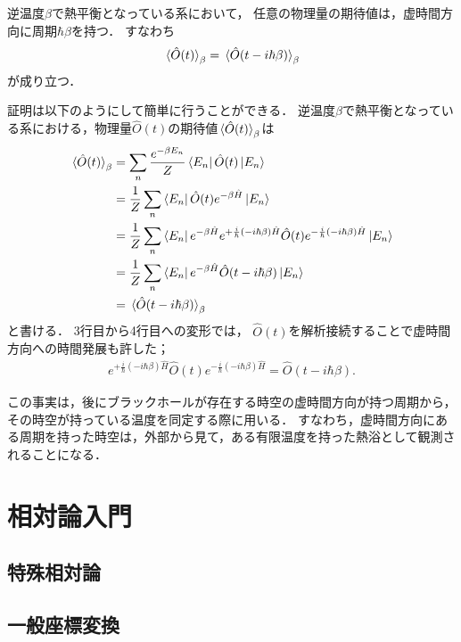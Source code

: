 \documentclass[uplatex,dvipdfmx]{vkaishi}
\begin{document}
逆温度$\beta$で熱平衡となっている系において，
任意の物理量の期待値は，虚時間方向に周期$\hbar\beta$を持つ．
すなわち
\begin{align}
  \expval*{\hat O(t)}_\beta
  = \expval*{\hat O(t - i\hbar\beta)}_\beta
  \label{eq:O-period}
\end{align}
が成り立つ．

証明は以下のようにして簡単に行うことができる．
逆温度$\beta$で熱平衡となっている系における，物理量$\hat O(t)$の期待値$\expval*{\hat O(t)}_\beta$は
\begin{align*}
  \expval*{\hat O(t)}_\beta
  &= \sum_n \frac{e^{-\beta E_n}}{Z} \bra{E_n} \hat O(t) \ket{E_n} \\
  &= \frac1Z \sum_n \bra{E_n} \hat O(t) e^{-\beta \hat H} \ket{E_n} \\
  &= \frac1Z \sum_n \bra{E_n} e^{-\beta \hat H} e^{+\frac{i}{\hbar}(-i\hbar\beta) \hat H} \hat O(t) e^{-\frac{i}{\hbar}(-i\hbar\beta) \hat H} \ket{E_n} \\
  &= \frac1Z \sum_n \bra{E_n} e^{-\beta \hat H} \hat O(t - i\hbar\beta) \ket{E_n} \\
    &= \expval*{\hat O(t - i\hbar\beta)}_\beta
\end{align*}
と書ける．
3行目から4行目への変形では，
$\hat O(t)$を解析接続することで虚時間方向への時間発展も許した；
\begin{align}
  e^{+\frac{i}{\hbar}(-i\hbar\beta) \hat H} \hat O(t) e^{-\frac{i}{\hbar}(-i\hbar\beta) \hat H}
  = \hat O(t - i\hbar\beta).
\end{align}
\QED

この事実は，後にブラックホールが存在する時空の虚時間方向が持つ周期から，その時空が持っている温度を同定する際に用いる．
すなわち，虚時間方向にある周期を持った時空は，外部から見て，ある有限温度を持った熱浴として観測されることになる．


\section{相対論入門}

\subsection{特殊相対論}

\subsection{一般座標変換}
\end{document}
